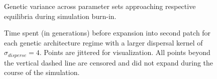 \begin{figure}[h]
\centering
{}
\caption[~- Genetic variance across parameter sets.]{Genetic variance across parameter sets approaching respective equilibria during simulation burn-in.}
\label{fig:VaAmong}
\end{figure}


\begin{figure}[h]
\centering
{}
\caption[~- Time spent before expansion into second patch.]{Time spent (in generations) before expansion into second patch for each genetic architecture regime with a larger dispersal kernel of $\sigma_{disperse} = 4$. Points are jittered for visualization. All points beyond the vertical dashed line are censored and did not expand during the course of the simulation.}
\label{fig:waittimes200}
\end{figure}



